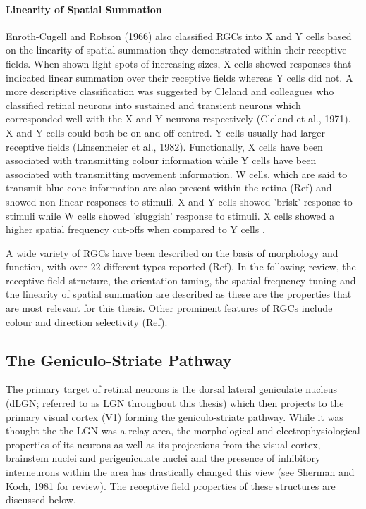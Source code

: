 \paragraph{Linearity of Spatial Summation}

Enroth-Cugell and Robson (1966) also classified RGCs into X and Y cells based on the linearity of spatial summation they demonstrated within their receptive fields. When shown light spots of increasing sizes, X cells showed responses that indicated linear summation over their receptive fields whereas Y cells did not. A more descriptive classification was suggested by Cleland and colleagues who classified retinal neurons into sustained and transient neurons which corresponded well with the X and Y neurons respectively (Cleland et al., 1971). X and Y cells could both be on and off centred. Y cells usually had larger receptive fields (Linsenmeier et al., 1982). Functionally, X cells have been associated with transmitting colour information while Y cells have been associated with transmitting movement information. W cells, which are said to transmit blue cone information are also present within the retina (Ref) and showed non-linear responses to stimuli. X and Y cells showed 'brisk' response to stimuli while W cells showed 'sluggish' response to stimuli. X cells showed a higher spatial frequency cut-offs when compared to Y cells \cite{Thibos1983}.


A wide variety of RGCs have been described on the basis of morphology and function, with over 22 different types reported (Ref). In the following review, the receptive field structure, the orientation tuning, the spatial frequency tuning and the linearity of spatial summation are described as these are the properties that are most relevant for this thesis. Other prominent features of RGCs include colour and direction selectivity (Ref).

\subsection{The Geniculo-Striate Pathway }

The primary target of retinal neurons is the dorsal lateral geniculate nucleus (dLGN; referred to as LGN throughout this thesis) which then projects to the primary visual cortex (V1) forming the geniculo-striate pathway. While it was thought the the LGN was a relay area, the morphological and electrophysiological properties of its neurons as well as its projections from the visual cortex, brainstem nuclei and perigeniculate nuclei and the presence of inhibitory interneurons within the area has drastically changed this view (see Sherman and Koch, 1981 for review). The receptive field properties of these structures are discussed below.

